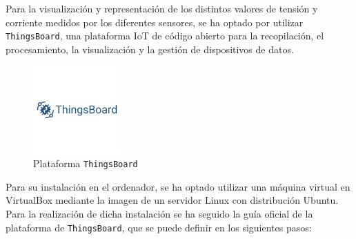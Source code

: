 Para la visualización y representación de los distintos valores de tensión y corriente medidos por los diferentes sensores, se ha optado por utilizar \texttt{ThingsBoard}, una plataforma IoT de código abierto para la recopilación, el procesamiento, la visualización y la gestión de dispositivos de datos.

\begin{figure}[H]
    \centering
    \includegraphics[width=0.3\textwidth]{images/3-software/3-2-2-thingsboard/LogoThingsboard.png}
    \caption{Plataforma \texttt{ThingsBoard}}
    \label{fig:3-2-2-ThingsBoard}
\end{figure}

Para su instalación en el ordenador, se ha optado utilizar una máquina virtual en VirtualBox mediante la imagen de un servidor Linux con distribución Ubuntu. Para la realización de dicha instalación se ha seguido la guía oficial de la plataforma de \texttt{ThingsBoard}, que se puede definir en los siguientes pasos: \cite{thingsboardInstallingThingsBoardCE}

